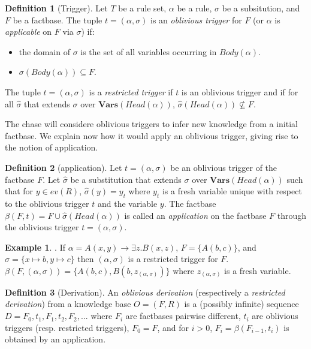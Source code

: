 \documentclass{article}
\theoremstyle{definition}
\newtheorem{definition}{Definition}[section]
\newtheorem{example}{Example}[section]
\theoremstyle{remark}
\newcommand{\Vars}{\textbf{Vars}}
\begin{document}
\begin{definition}[Trigger]
Let $T$ be a rule set, $\alpha$ be a rule, $\sigma$ be a subsitution, and $F$ be a factbase. The tuple $t = (\alpha,\sigma)$ is an \emph{oblivious trigger} for $F$ (or $\alpha$ is \emph{applicable} on $F$ via $\sigma$) if: 
\begin{itemize}
\item the domain of $\sigma$ is the set of all variables occurring in $Body(\alpha)$.
\item $\sigma(Body(\alpha)) \subseteq F$.
\end{itemize}
The tuple $t = (\alpha,\sigma)$ is a \emph{restricted trigger} if $t$ is an oblivious trigger and if for all $\hat \sigma$ that extends $\sigma$ over $\Vars(\textit{Head}(\alpha))$, $\hat \sigma(Head(\alpha)) \nsubseteq F$.

\end{definition} 

The chase will considere oblivious triggers to infer new knowledge from a initial factbase. We explain now how it would apply an oblivious trigger, giving rise to the notion of application. 

\begin{definition}[application]
Let $t = (\alpha,\sigma)$ be an oblivious trigger of the factbase $F$. Let $\hat \sigma$ be a substitution that extends $\sigma$ over $\Vars(\textit{Head}(\alpha))$ such that for $y \in \textit{ev}(R)$, $\hat \sigma(y) = y_t$ where $y_t$ is a fresh variable unique with respect to the oblivious trigger $t$ and the variable $y$.
The factbase $\beta(F,t)=F \cup \hat \sigma(\textit{Head}(\alpha))$ is called an \emph{application} on the factbase $F$ through the oblivious trigger $t = (\alpha,\sigma)$.
\end{definition}

\begin{example}. If $\alpha = A(x,y) \rightarrow \exists z.B(x,z)$, $F = \{A(b,c)\}$, and $\sigma = \{x \mapsto b, y \mapsto c \}$ then $(\alpha,\sigma)$ is a restricted trigger for $F$. $\beta(F,(\alpha,\sigma)) = \{A(b,c),B(b,z_{(\alpha,\sigma)})\}$ where $z_{(\alpha,\sigma)}$ is a fresh variable.
\end{example}

\begin{definition}[Derivation]
An \emph{oblivious derivation} (respectively a \emph{restricted derivation}) from a knowledge base $O= (F,R)$ is a (possibly infinite) sequence $D=F_0,t_1,F_1,t_2,F_2,...$ where $F_i$ are factbases pairwise different, $t_i$ are oblivious triggers (resp. restricted triggers), $F_0 = F$, and for $i >0$, $F_{i}= \beta(F_{i-1},t_i)$ is obtained by an application. 
\end{definition}
\end{document}
